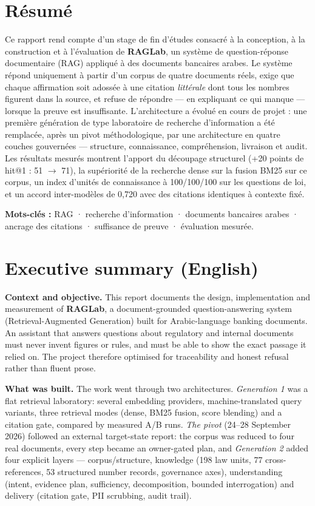\documentclass[a4paper,12pt]{report}
\begin{document}
\chapter*{Résumé}
Ce rapport rend compte d'un stage de fin d'études consacré à la conception, à la construction et
à l'évaluation de \textbf{RAGLab}, un système de question-réponse documentaire (RAG) appliqué à
des documents bancaires arabes. Le système répond uniquement à partir d'un corpus de quatre
documents réels, exige que chaque affirmation soit adossée à une citation \emph{littérale} dont
tous les nombres figurent dans la source, et refuse de répondre — en expliquant ce qui manque —
lorsque la preuve est insuffisante. L'architecture a évolué en cours de projet : une première
génération de type laboratoire de recherche d'information a été remplacée, après un pivot
méthodologique, par une architecture en quatre couches gouvernées — structure, connaissance,
compréhension, livraison et audit. Les résultats mesurés montrent l'apport du découpage structurel
(+20 points de hit@1 : 51 $\rightarrow$ 71), la supériorité de la recherche dense sur la fusion
BM25 sur ce corpus, un index d'unités de connaissance à 100/100/100 sur les questions de loi, et
un accord inter-modèles de 0,720 avec des citations identiques à contexte fixé.

\textbf{Mots-clés :} RAG · recherche d'information · documents bancaires arabes · ancrage des
citations · suffisance de preuve · évaluation mesurée.

\chapter*{Executive summary (English)}
\textbf{Context and objective.} This report documents the design, implementation and measurement
of \textbf{RAGLab}, a document-grounded question-answering system (Retrieval-Augmented Generation)
built for Arabic-language banking documents. An assistant that answers questions about regulatory
and internal documents must never invent figures or rules, and must be able to show the exact
passage it relied on. The project therefore optimised for traceability and honest refusal rather
than fluent prose.

\textbf{What was built.} The work went through two architectures. \emph{Generation 1} was a flat
retrieval laboratory: several embedding providers, machine-translated query variants, three
retrieval modes (dense, BM25 fusion, score blending) and a citation gate, compared by measured
A/B runs. \emph{The pivot} (24--28 September 2026) followed an external target-state report: the
corpus was reduced to four real documents, every step became an owner-gated plan, and
\emph{Generation 2} added four explicit layers — corpus/structure, knowledge (198 law units,
77 cross-references, 53 structured number records, governance axes), understanding (intent,
evidence plan, sufficiency, decomposition, bounded interrogation) and delivery (citation gate,
PII scrubbing, audit trail).
\end{document}
